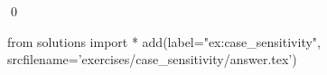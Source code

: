 
\begin{ex} 
  \label{ex:case_sensitivity}
  
  \qed
\end{ex} 
\begin{python0}
from solutions import *
add(label="ex:case_sensitivity",
    srcfilename='exercises/case_sensitivity/answer.tex') 
\end{python0}
